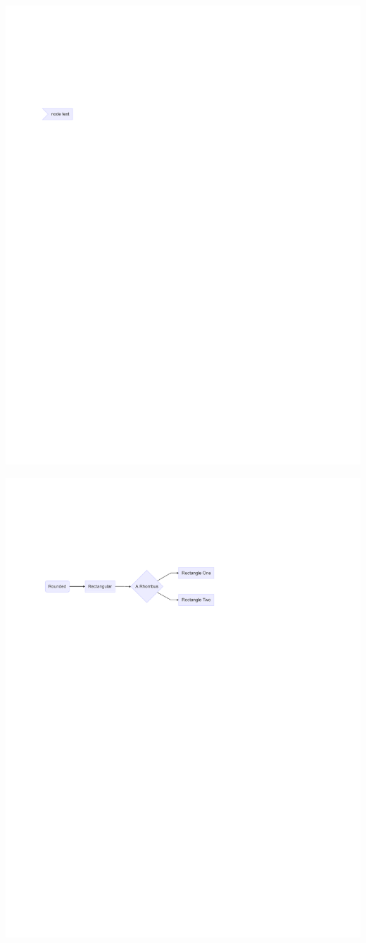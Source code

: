 \documentclass[
  letterpaper,
]{scrbook}
\begin{document}
\includegraphics{./summary_files/figure-pdf/unnamed-chunk-4-5.pdf}

\includegraphics{./summary_files/figure-pdf/unnamed-chunk-4-6.pdf}
\end{document}
